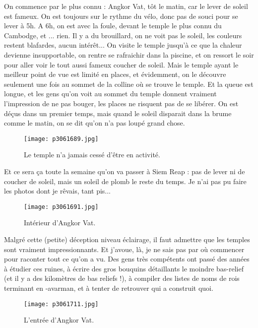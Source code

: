 \documentclass{book}
\begin{document}
On commence par le plus connu : Angkor Vat, tôt le matin, car le lever de soleil est fameux. On est toujours sur le rythme du vélo, donc pas de souci pour se lever à 5h. A 6h, on est avec la foule, devant le temple le plus connu du Cambodge, et ... rien. Il y a du brouillard, on ne voit pas le soleil, les couleurs restent blafardes, aucun intérêt... On visite le temple jusqu'à ce que la chaleur devienne insupportable, on rentre se rafraichir dans la piscine, et on ressort le soir pour aller voir le tout aussi fameux coucher de soleil. Mais le temple ayant le meilleur point de vue est limité en places, et évidemment, on le découvre seulement une fois au sommet de la colline où se trouve le temple. Et la queue est longue, et les gens qu'on voit au sommet du temple donnent vraiment l'impression de ne pas bouger, les places ne risquent pas de se libérer. On est déçus dans un premier temps, mais quand le soleil disparait dans la brume comme le matin, on se dit qu'on n'a pas loupé grand chose.


\begin{figure}[h]
\centering
\texttt{[image: p3061689.jpg]}
\caption*{Le temple n'a jamais cessé d'être en activité.}
\end{figure}

Et ce sera ça toute la semaine qu'on va passer à Siem Reap :  pas de lever ni de coucher de soleil, mais un soleil de plomb le reste du temps. Je n'ai pas pu faire les photos dont je rêvais, tant pis...


\begin{figure}[h]
\centering
\texttt{[image: p3061691.jpg]}
\caption*{Intérieur d'Angkor Vat.}
\end{figure}

Malgré cette (petite) déception niveau éclairage, il faut admettre que les temples sont vraiment impressionnants. Et j'avoue, là, je ne sais pas par où commencer pour raconter tout ce qu'on a vu. Des gens très compétents ont passé des années à étudier ces ruines, à écrire des gros bouquins détaillants le moindre bas-relief (et il y a des kilomètres de bas reliefs !), à compiler des listes de noms de rois terminant en -avarman, et à tenter de retrouver qui a construit quoi.


\begin{figure}[h]
\centering
\texttt{[image: p3061711.jpg]}
\caption*{L'entrée d'Angkor Vat.}
\end{figure}
\end{document}
